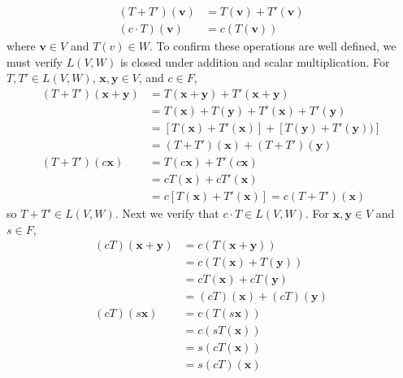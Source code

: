 \documentclass{article}
\newcommand{\x}{\mathbf{x}}
\newcommand{\y}{\mathbf{y}}
\theoremstyle{definition}
\begin{document}
	\begin{align*}
		(T+T')(\mathbf v) &= T(\mathbf v) + T'(\mathbf v) \\ 
		(c\cdot T)(\mathbf v) &= c(T(\mathbf v))
	\end{align*}
	where $ \mathbf v\in V $ and $ T(v)\in W $. To confirm these operations are well defined, we must verify $ L(V,W) $ is closed under addition and scalar multiplication. For $ T,T'\in L(V,W) $, $ \x,\y\in V $, and $ c\in F $,
	\begin{align*}
		(T+T')(\x+\y) &= T(\x+\y) + T'(\x+\y) \\&= T(\x) + T(\y) + T'(\x) + T'(\y)\\& = [T(\x) + T'(\x)] + [T(\y) + T'(\y))] \\& = (T+T')(\x) +(T+T')(\y) \\ (T+T')(c\x) &= T(c\x) + T'(c\x)\\ & = cT(\x) + cT'(\x) \\ & = c[T(\x) + T'(\x)] = c(T+T')(\x)
	\end{align*}
	so $ T+T'\in L(V,W) $. Next we verify that $ c\cdot T\in L(V,W) $. For $ \x,\y \in V $ and $ s\in F $, 
	\begin{align*}
		(cT)(\x +\y) &= c(T(\x +\y)) \\
		& = c(T(\x) + T(\y)) \\ & = cT(\x) + cT(\y) \\ & = (cT)(\x) + (cT)(\y)\\ 
		(cT)(s\x) & = c(T(s\x)) \\& = c(sT(\x)) \\ & = s(cT(\x)) \\ & = s(cT)(\x)
	\end{align*}
	
\end{document}
